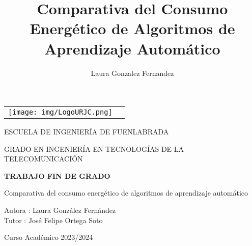 \documentclass[a4paper, 12pt, oneside]{book}
\title{Comparativa del Consumo Energético de Algoritmos de Aprendizaje Automático}
\author{Laura Gonzalez Fernandez}
\begin{document}
 


\begin{titlepage}
\begin{center}
\begin{tabular}[c]{c c}
\texttt{[image: img/LogoURJC.png]}
\\
\end{tabular}

\vspace{1.5cm}

\Large 
ESCUELA DE INGENIERÍA DE FUENLABRADA

\vspace{1.2cm}

\Large 
GRADO EN INGENIERÍA EN TECNOLOGÍAS DE LA TELECOMUNICACIÓN

\vspace{0.8cm}
\LARGE 
\textbf{\uppercase{Trabajo Fin de Grado}}

\vspace{2cm}

\LARGE Comparativa del consumo energético de algoritmos de aprendizaje automático
\vspace{2cm}

\large
Autora : Laura González Fernández \\
Tutor : José Felipe Ortega Soto

\vspace{0.8cm}
\large
Curso Académico 2023/2024

\end{center}
\end{titlepage}


\newpage
\mbox{}


\clearpage
\frontmatter
\pagestyle{empty}
\end{document}
